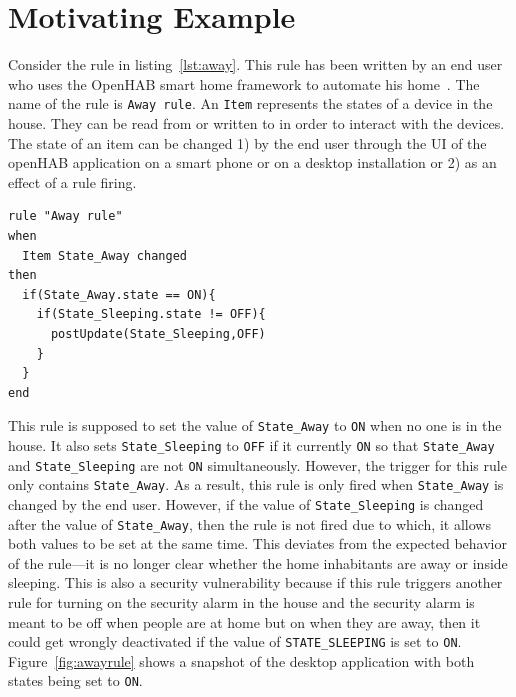 \documentclass{sig-alternate-05-2015}
\begin{document}
\section{Motivating Example}
\label{sec:motivation}
Consider the rule in listing~\ref{lst:away}. This rule has been written by an end user who uses the OpenHAB smart home framework to automate his home~\cite{data1}. The name of the rule is \texttt{Away rule}. An \texttt{Item} represents the states of a device in the house. They can be read from or written to in order to interact with the devices. The state of an item can be changed 1) by the end user through the UI of the openHAB application on a smart phone or on a desktop installation or 2) as an effect of a rule firing.
\begin{lstlisting}[caption={Rule for setting the Away or Sleeping state.},label={lst:away}]
rule "Away rule"
when
  Item State_Away changed 	
then
  if(State_Away.state == ON){
    if(State_Sleeping.state != OFF){
      postUpdate(State_Sleeping,OFF)
    }
  }
end
\end{lstlisting}
This rule is supposed to set the value of \texttt{State\_Away} to \texttt{ON} when no one is in the house. It also sets \texttt{State\_Sleeping} to \texttt{OFF} if it currently \texttt{ON} so that  \texttt{State\_Away} and \texttt{State\_Sleeping} are not \texttt{ON} simultaneously. However, the trigger for this rule only contains \texttt{State\_Away}. As a result, this rule is only fired when \texttt{State\_Away} is changed by the end user. However, if the value of \texttt{State\_Sleeping} is changed after the value of \texttt{State\_Away}, then the rule is not fired due to which, it allows both values to be set at the same time. This deviates from the expected behavior of the rule---it is no longer clear whether the home inhabitants are away or inside sleeping. This is also a security vulnerability because if this rule triggers another rule for turning on the security alarm in the house and the security alarm is meant to be off when people are at home but on when they are away, then it could get wrongly deactivated if the value of \texttt{STATE\_SLEEPING} is set to \texttt{ON}. Figure~\ref{fig:awayrule} shows a snapshot of the desktop application with both states being set to \texttt{ON}. 
\end{document}
